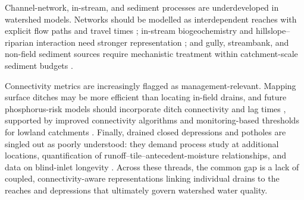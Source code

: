 \documentclass[11pt]{article}
\begin{document}
Channel-network, in-stream, and sediment processes are underdeveloped in
watershed models. Networks should be modelled as interdependent reaches with
explicit flow paths and travel times \parencite{Giraud1997,Williamson2025};
in-stream biogeochemistry and hillslope--riparian interaction need stronger
representation \parencite{Schilling2012b,Basu2010}; and gully, streambank, and
non-field sediment sources require mechanistic treatment within catchment-scale
sediment budgets \parencite{Maalim2013,Dalzell2018,Walling2002}.

Connectivity metrics are increasingly flagged as management-relevant. Mapping
surface ditches may be more efficient than locating in-field drains, and future
phosphorus-risk models should incorporate ditch connectivity and lag times
\parencite{Moloney2020,Opoku2024}, supported by improved connectivity
algorithms and monitoring-based thresholds for lowland catchments
\parencite{Calsamiglia2018}. Finally, drained closed depressions and potholes
are singled out as poorly understood: they demand process study at additional
locations, quantification of runoff--tile--antecedent-moisture relationships,
and data on blind-inlet longevity
\parencite{Martin2019,Williams2020,Feyereisen2015b}. Across these threads, the
common gap is a lack of coupled, connectivity-aware representations linking
individual drains to the reaches and depressions that ultimately govern
watershed water quality.

\printbibliography
\end{document}
